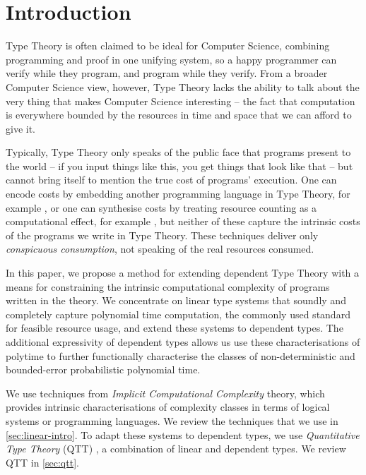 \documentclass[acmsmall,screen]{acmart}
\begin{document}
\section{Introduction}
\label{sec:introduction}

Type Theory is often claimed to be ideal for Computer Science,
combining programming and proof in one unifying system, so a happy
programmer can verify while they program, and program while they
verify. From a broader Computer Science view, however, Type Theory
lacks the ability to talk about the very thing that makes Computer
Science interesting -- the fact that computation is everywhere bounded
by the resources in time and space that we can afford to give it.

Typically, Type Theory only speaks of the public face that programs
present to the world -- if you input things like this, you get things
that look like that -- but cannot bring itself to mention the true
cost of programs' execution. One can encode costs by embedding another
programming language in Type Theory, for example \cite{GueneauCP18},
or one can synthesise costs by treating resource counting as a
computational effect, for example \cite{Danielsson08,NiuSGH22}, but
neither of these capture the intrinsic costs of the programs we write
in Type Theory. These techniques deliver only \emph{conspicuous
  consumption}, not speaking of the real resources consumed.

In this paper, we propose a method for extending dependent Type Theory
with a means for constraining the intrinsic computational complexity
of programs written in the theory. We concentrate on linear type
systems that soundly and completely capture polynomial time
computation, the commonly used standard for feasible resource usage,
and extend these systems to dependent types. The additional
expressivity of dependent types allows us use these characterisations
of polytime to further functionally characterise the classes of
non-deterministic and bounded-error probabilistic polynomial time.

We use techniques from \emph{Implicit Computational Complexity}
theory, which provides intrinsic characterisations of complexity
classes in terms of logical systems or programming languages. We
review the techniques that we use in \autoref{sec:linear-intro}. To
adapt these systems to dependent types, we use \emph{Quantitative Type
  Theory} (QTT) \cite{atkey18qtt,mcbride16}, a combination of linear
and dependent types. We review QTT in \autoref{sec:qtt}.
\end{document}
